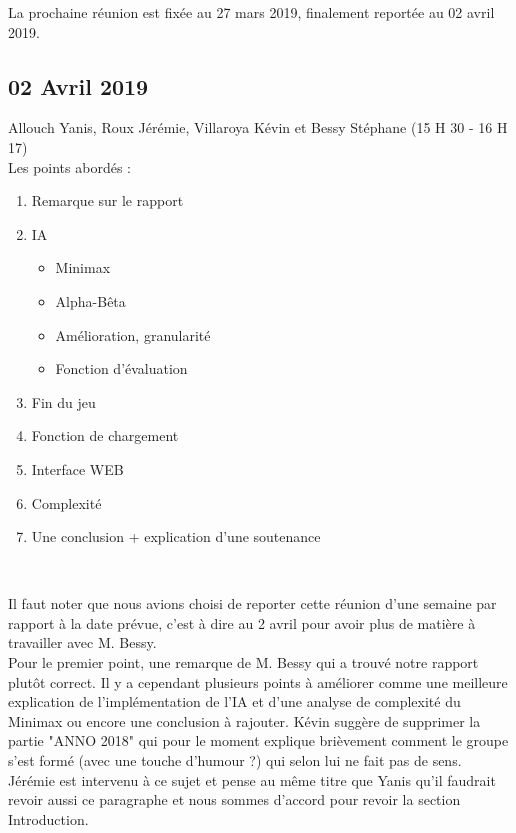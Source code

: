 \documentclass[11pt,a4paper]{article}
\begin{document}
    La prochaine réunion est fixée au 27 mars 2019, finalement reportée au 02 avril 2019.


\newpage
\subsection{02 Avril 2019}
Allouch Yanis, Roux Jérémie, Villaroya Kévin et Bessy Stéphane (15 H 30 - 16 H 17)\\

Les points abordés :
\begin{enumerate}
    \item Remarque sur le rapport
    \item IA
    \begin{itemize}
        \item Minimax
        \item Alpha-Bêta
        \item Amélioration, granularité
        \item Fonction d'évaluation
    \end{itemize}
    \item Fin du jeu
    \item Fonction de chargement
    \item Interface WEB
    \item Complexité
    \item Une conclusion + explication d'une soutenance
\end{enumerate}

\begin{tabular}{c}
    \hline
\end{tabular}\\
    
    Il faut noter que nous avions choisi de reporter cette réunion d'une semaine par rapport à la date prévue, c'est à dire au 2 avril pour avoir plus de matière à travailler avec M. Bessy.\\
    
    Pour le premier point, une remarque de M. Bessy qui a trouvé notre rapport plutôt correct. Il y a cependant plusieurs points à améliorer comme une meilleure explication de l'implémentation de l'IA et d'une analyse de complexité du Minimax ou encore une conclusion à rajouter. Kévin suggère de supprimer la partie "ANNO 2018" qui pour le moment explique brièvement comment le groupe s'est formé (avec une touche d'humour ?) qui selon lui ne fait pas de sens. Jérémie est intervenu à ce sujet et pense au même titre que Yanis qu'il faudrait revoir aussi ce paragraphe et nous sommes d'accord pour revoir la section Introduction.\\
    
\end{document}
